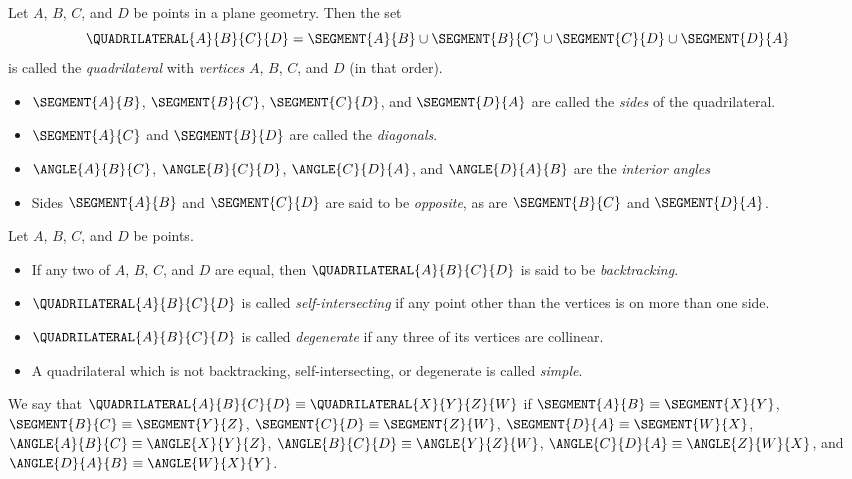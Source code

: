 \begin{dfn}[Quadrilateral]
Let \(A\), \(B\), \(C\), and \(D\) be points in a plane geometry. Then the set \[ \QUADRILATERAL{A}{B}{C}{D} = \SEGMENT{A}{B} \cup \SEGMENT{B}{C} \cup \SEGMENT{C}{D} \cup \SEGMENT{D}{A} \] is called the \emph{quadrilateral} with \emph{vertices} \(A\), \(B\), \(C\), and \(D\) (in that order).
\begin{itemize}
\item \(\SEGMENT{A}{B}\), \(\SEGMENT{B}{C}\), \(\SEGMENT{C}{D}\), and \(\SEGMENT{D}{A}\) are called the \emph{sides} of the quadrilateral.
\item \(\SEGMENT{A}{C}\) and \(\SEGMENT{B}{D}\) are called the \emph{diagonals}.
\item \(\ANGLE{A}{B}{C}\), \(\ANGLE{B}{C}{D}\), \(\ANGLE{C}{D}{A}\), and \(\ANGLE{D}{A}{B}\) are the \emph{interior angles}
\item Sides \(\SEGMENT{A}{B}\) and \(\SEGMENT{C}{D}\) are said to be \emph{opposite}, as are \(\SEGMENT{B}{C}\) and \(\SEGMENT{D}{A}\).
\end{itemize}
\end{dfn}

\begin{dfn}
Let \(A\), \(B\), \(C\), and \(D\) be points.
\begin{itemize}
\item If any two of \(A\), \(B\), \(C\), and \(D\) are equal, then \(\QUADRILATERAL{A}{B}{C}{D}\) is said to be \emph{backtracking}.
\item \(\QUADRILATERAL{A}{B}{C}{D}\) is called \emph{self-intersecting} if any point other than the vertices is on more than one side.
\item \(\QUADRILATERAL{A}{B}{C}{D}\) is called \emph{degenerate} if any three of its vertices are collinear.
\item A quadrilateral which is not backtracking, self-intersecting, or degenerate is called \emph{simple}.
\end{itemize}
\end{dfn}

\begin{dfn}
We say that \(\QUADRILATERAL{A}{B}{C}{D} \equiv \QUADRILATERAL{X}{Y}{Z}{W}\) if \(\SEGMENT{A}{B} \equiv \SEGMENT{X}{Y}\), \(\SEGMENT{B}{C} \equiv \SEGMENT{Y}{Z}\), \(\SEGMENT{C}{D} \equiv \SEGMENT{Z}{W}\), \(\SEGMENT{D}{A} \equiv \SEGMENT{W}{X}\), \(\ANGLE{A}{B}{C} \equiv \ANGLE{X}{Y}{Z}\), \(\ANGLE{B}{C}{D} \equiv \ANGLE{Y}{Z}{W}\), \(\ANGLE{C}{D}{A} \equiv \ANGLE{Z}{W}{X}\), and \(\ANGLE{D}{A}{B} \equiv \ANGLE{W}{X}{Y}\).
\end{dfn}

